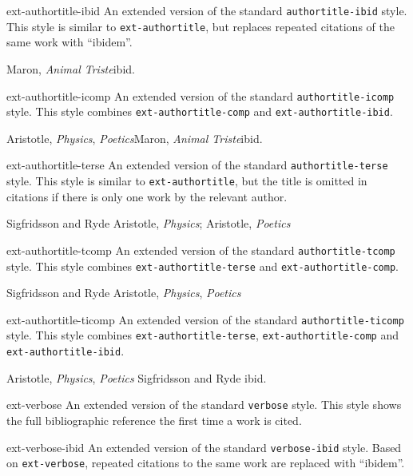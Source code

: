 \documentclass{ltxdockit}
\def\sty{\texttt}
\begin{document}
\begin{marglist}
\item[ext-authortitle-ibid]
An extended version of the standard \sty{authortitle-ibid} style.
This style is similar to \sty{ext-authortitle}, but replaces repeated
citations of the same work with \enquote{ibidem}.
\begin{tcolorbox}
Maron, \emph{Animal Triste}\quad ibid.
\end{tcolorbox}

\item[ext-authortitle-icomp]
An extended version of the standard \sty{authortitle-icomp} style.
This style combines \sty{ext-authortitle-comp} and
\sty{ext-authortitle-ibid}.
\begin{tcolorbox}
Aristotle, \emph{Physics}, \emph{Poetics}\quad Maron, \emph{Animal Triste}\quad ibid.
\end{tcolorbox}

\item[ext-authortitle-terse]
An extended version of the standard \sty{authortitle-terse} style.
This style is similar to \sty{ext-authortitle}, but the title is omitted in
citations if there is only one work by the relevant author.
\begin{tcolorbox}
Sigfridsson and Ryde \quad Aristotle, \emph{Physics}; Aristotle, \emph{Poetics}
\end{tcolorbox}

\item[ext-authortitle-tcomp]
An extended version of the standard \sty{authortitle-tcomp} style.
This style combines \sty{ext-authortitle-terse} and
\sty{ext-authortitle-comp}.
\begin{tcolorbox}
Sigfridsson and Ryde \quad Aristotle, \emph{Physics}, \emph{Poetics}
\end{tcolorbox}

\item[ext-authortitle-ticomp]
An extended version of the standard \sty{authortitle-ticomp} style.
This style combines \sty{ext-authortitle-terse},
\sty{ext-authortitle-comp} and \sty{ext-authortitle-ibid}.
\begin{tcolorbox}
Aristotle, \emph{Physics}, \emph{Poetics} \quad Sigfridsson and Ryde \quad ibid.
\end{tcolorbox}

\item[ext-verbose]
An extended version of the standard \sty{verbose} style.
This style shows the full bibliographic reference the first time a work is
cited.

\item[ext-verbose-ibid]
An extended version of the standard \sty{verbose-ibid} style.
Based on \sty{ext-verbose}, repeated citations to the same work are replaced
with \enquote{ibidem}.


\end{marglist}
\end{document}
